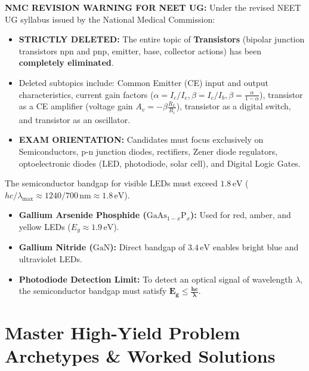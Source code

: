 \documentclass[10pt,twoside,openright]{book}
\begin{document}
\begin{trapbox}
\textbf{NMC REVISION WARNING FOR NEET UG:}
Under the revised NEET UG syllabus issued by the National Medical Commission:
\begin{itemize}
  \item \textbf{STRICTLY DELETED:} The entire topic of \textbf{Transistors} (bipolar junction transistors npn and pnp, emitter, base, collector actions) has been \textbf{completely eliminated}.
  \item Deleted subtopics include: Common Emitter (CE) input and output characteristics, current gain factors ($\alpha = I_c/I_e, \beta = I_c/I_b, \beta = \frac{\alpha}{1-\alpha}$), transistor as a CE amplifier (voltage gain $A_v = -\beta \frac{R_L}{R_i}$), transistor as a digital switch, and transistor as an oscillator.
  \item \textbf{EXAM ORIENTATION:} Candidates must focus exclusively on Semiconductors, p-n junction diodes, rectifiers, Zener diode regulators, optoelectronic diodes (LED, photodiode, solar cell), and Digital Logic Gates.
\end{itemize}
\end{trapbox}

\begin{ncertbox}
The semiconductor bandgap for visible LEDs must exceed $1.8\,\mathrm{eV}$ ($hc/\lambda_{\max} \approx 1240 / 700\,\mathrm{nm} \approx 1.8\,\mathrm{eV}$).
\begin{itemize}
  \item \textbf{Gallium Arsenide Phosphide ($\mathrm{GaAs}_{1-x}\mathrm{P}_x$):} Used for red, amber, and yellow LEDs ($E_g \approx 1.9\,\mathrm{eV}$).
  \item \textbf{Gallium Nitride ($\mathrm{GaN}$):} Direct bandgap of $3.4\,\mathrm{eV}$ enables bright blue and ultraviolet LEDs.
  \item \textbf{Photodiode Detection Limit:} To detect an optical signal of wavelength $\lambda$, the semiconductor bandgap must satisfy $\mathbf{E_g \le \frac{hc}{\lambda}}$.
\end{itemize}
\end{ncertbox}

\section{Master High-Yield Problem Archetypes \& Worked Solutions}
\end{document}
